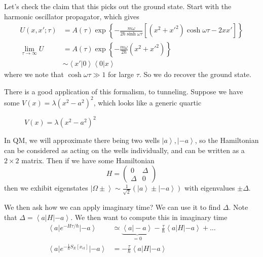 \documentclass[10pt]{report}
\newcommand{\bra}[1]{\left<#1\right|}
\newcommand{\ket}[1]{\left|#1\right>}
\newcommand{\dotp}[2]{\left<#1\left.\right|#2\right>}
\begin{document}
Let's check the claim that this picks out the ground state. Start with the harmonic oscillator propagator, which gives
\begin{align}
    U(x,x'; \tau) &= A(\tau)\exp\left\{ -\frac{m\omega}{2\hbar\sinh \omega \tau}\left[ (x^2 + x'^2)\cosh \omega \tau - 2xx' \right] \right\}\\
    \lim_{\tau \to \infty} U &= A(\tau) \exp\left\{ -\frac{m\omega}{2\hbar}(x^2 + x'^2) \right\}\\
    &\sim \dotp{x'}{0}\dotp{0}{x}
\end{align}
where we note that $\cosh \omega \tau \gg 1$ for large $\tau$. So we do recover the ground state.

There is a good application of this formalism, to tunneling. Suppose we have some $V(x) = \lambda(x^2 - a^2)^2$, which looks like a generic quartic
\begin{figure}[!h]
    \centering
    \caption{$V(x) = \lambda(x^2 - a^2)^2$}
    \label{4.7.V}
\end{figure}

In QM, we will approximate there being two wells $\ket{a}, \ket{-a}$, so the Hamiltonian can be considered as acting on the wells individually, and can be written as a $2\times2$ matrix. Then if we have some Hamiltonian
\begin{equation}
    H = \begin{pmatrix} 0 & \Delta\\ \Delta & 0 \end{pmatrix} 
\end{equation}
then we exhibit eigenstates $\ket{\Omega\pm} \sim \frac{1}{\sqrt{2}}\left( \ket{a} \pm \ket{-a} \right)$ with eigenvalues $\pm \Delta$.

We then ask how we can apply imaginary time? We can use it to find $\Delta$. Note that $\Delta = \bra{a}H\ket{-a}$. We then want to compute this in imaginary time
\begin{align}
    \bra{a}e^{-H\tau/\hbar}\ket{-a} &\simeq \underbrace{\dotp{a}{-a}}_{=0} - \frac{\tau}{\hbar}\bra{a}H\ket{-a} + \dots\\
    \bra{a}e^{-\frac{1}{\hbar}S_E[x_{cl}]}\ket{-a} &= - \frac{\tau}{\hbar}\bra{a}H\ket{-a}
\end{align}
\end{document}
